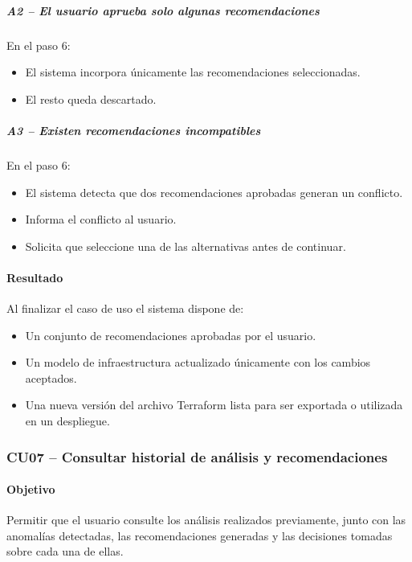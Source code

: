 \subparagraph{A2 -- El usuario aprueba solo algunas recomendaciones}

En el paso 6:

\begin{itemize}
\item El sistema incorpora únicamente las recomendaciones seleccionadas.
\item El resto queda descartado.
\end{itemize}

\subparagraph{A3 -- Existen recomendaciones incompatibles}

En el paso 6:

\begin{itemize}
\item El sistema detecta que dos recomendaciones aprobadas generan un conflicto.
\item Informa el conflicto al usuario.
\item Solicita que seleccione una de las alternativas antes de continuar.
\end{itemize}

\paragraph*{Resultado}

Al finalizar el caso de uso el sistema dispone de:

\begin{itemize}
\item Un conjunto de recomendaciones aprobadas por el usuario.
\item Un modelo de infraestructura actualizado únicamente con los cambios aceptados.
\item Una nueva versión del archivo Terraform lista para ser exportada o utilizada en un despliegue.
\end{itemize}

\subsubsection{CU07 -- Consultar historial de análisis y recomendaciones}

\paragraph*{Objetivo}

Permitir que el usuario consulte los análisis realizados previamente, junto con las anomalías detectadas, las recomendaciones generadas y las decisiones tomadas sobre cada una de ellas.

